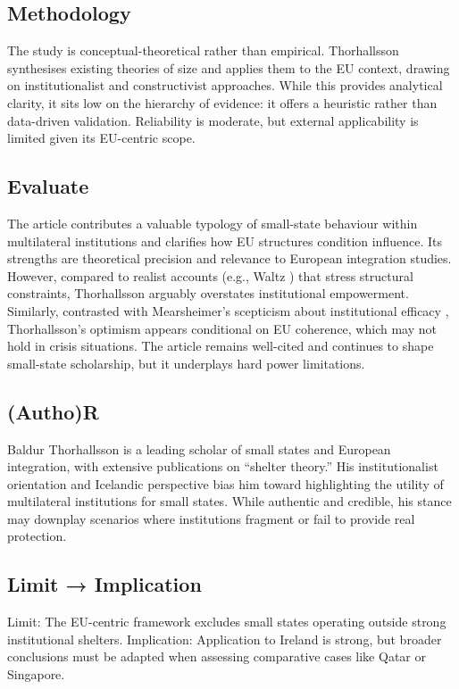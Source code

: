 \subsection*{Methodology}
The study is conceptual-theoretical rather than empirical. Thorhallsson synthesises existing theories of size and applies them to the EU context, drawing on institutionalist and constructivist approaches. While this provides analytical clarity, it sits low on the hierarchy of evidence: it offers a heuristic rather than data-driven validation. Reliability is moderate, but external applicability is limited given its EU-centric scope.

\subsection*{Evaluate}
The article contributes a valuable typology of small-state behaviour within multilateral institutions and clarifies how EU structures condition influence. Its strengths are theoretical precision and relevance to European integration studies. However, compared to realist accounts (e.g., Waltz \parencite{WALTZ_1979}) that stress structural constraints, Thorhallsson arguably overstates institutional empowerment. Similarly, contrasted with Mearsheimer’s scepticism about institutional efficacy \parencite{MEARSHEIMER_1994}, Thorhallsson’s optimism appears conditional on EU coherence, which may not hold in crisis situations. The article remains well-cited and continues to shape small-state scholarship, but it underplays hard power limitations.

\subsection*{(Autho)R}
Baldur Thorhallsson is a leading scholar of small states and European integration, with extensive publications on “shelter theory.” His institutionalist orientation and Icelandic perspective bias him toward highlighting the utility of multilateral institutions for small states. While authentic and credible, his stance may downplay scenarios where institutions fragment or fail to provide real protection.

\subsection*{Limit → Implication}
Limit: The EU-centric framework excludes small states operating outside strong institutional shelters.  
Implication: Application to Ireland is strong, but broader conclusions must be adapted when assessing comparative cases like Qatar or Singapore.

